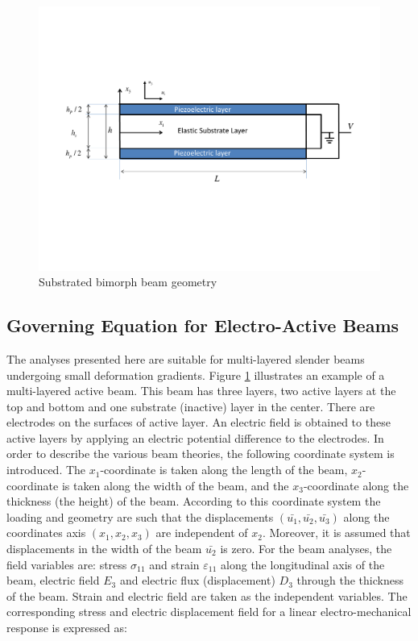 \begin{figure}
\centering
\includegraphics[trim = 0mm 70mm 10mm 60mm,
clip,width=7.0in]{./chap_4_structural_analyses/pdf_beam/PVDF_beam_geometry.pdf}
\caption{Substrated bimorph beam geometry}
\label{fig:PVDF_beam_geometry}
\end{figure}

\subsection{Governing Equation for Electro-Active Beams}
The analyses presented here are suitable for multi-layered slender beams undergoing small deformation gradients.
Figure \ref{fig:PVDF_beam_geometry} illustrates an example of a multi-layered active beam.
This beam has three layers, two active layers at the top and bottom and one substrate (inactive) layer in the center.
There are electrodes on the surfaces of active layer.
An electric field is obtained to these active layers by applying an electric potential difference to the electrodes.
In order to describe the various beam theories, the following coordinate system is introduced.
The
 $x_1$-coordinate is taken along the length of the beam,
 $x_2$-coordinate is taken along the width of the beam, and the
 $x_3$-coordinate along the thickness (the height) of the beam.
According to this coordinate system the loading and geometry are such that the displacements
 $(\bar {u_1}, \bar {u_2}, \bar {u_3})$ along the coordinates axis
 $( {x_1}, {x_2},  {x_3})$ are independent of $x_2$.
Moreover, it is assumed that displacements in the width of the beam $\bar {u_2}$ is zero.
For the beam analyses, the field variables are:
stress $\sigma_{11}$ and
strain $\varepsilon_{11}$ along the longitudinal axis of the beam,
electric field $E_3$ and electric flux (displacement) $D_3$ through the thickness of the beam.
Strain and electric field are taken as the independent variables.
The corresponding stress and electric displacement field for a linear electro-mechanical response is expressed as:

